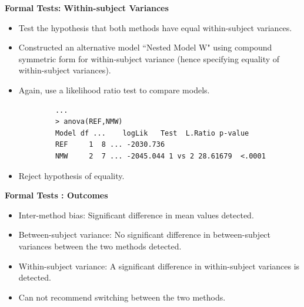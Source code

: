 \documentclass[compress]{beamer}        %
\makeatletter
\newcommand{\tcb}{\textcolor{beamer@blendedblue}}
\makeatother
\begin{document}
		\begin{frame}[fragile]{\bf \tcb{Formal Tests: Within-subject Variances}}
			\begin{itemize}
				\item Test the hypothesis that both methods have equal within-subject variances.
				\item Constructed an alternative model ``Nested Model W" using compound symmetric form for within-subject variance (hence specifying equality of within-subject variances).
				\item Again, use a likelihood ratio test to compare models.
			\end{itemize}
			\begin{verbatim}
			...
			> anova(REF,NMW)
			Model df ...    logLik   Test  L.Ratio p-value
			REF     1  8 ... -2030.736
			NMW     2  7 ... -2045.044 1 vs 2 28.61679  <.0001
			\end{verbatim}
			\begin{itemize}
				\item Reject hypothesis of equality.
			\end{itemize}
		\end{frame}
		\begin{frame}[fragile]{\bf \tcb{Formal Tests : Outcomes}}
			\begin{itemize}
				\item Inter-method bias: Significant difference in mean values detected.\\
				\vspace{0.25cm}\item Between-subject variance: No significant difference in between-subject variances between the two methods detected.\\
				\vspace{0.25cm}\item Within-subject variance: A significant difference in within-subject variances is detected.\\
				\vspace{0.25cm}\item Can not recommend switching between the two methods.
			\end{itemize}
		\end{frame}
\end{document}
